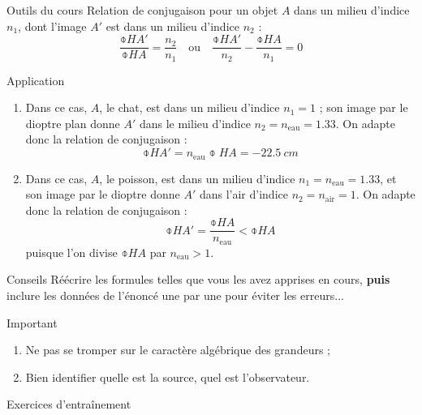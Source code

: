 \documentclass[10pt,notitlepage]{book}
\begin{document}
\begin{NCdemo}{Outils du cours}
    Relation de conjugaison pour un objet $A$ dans un milieu d'indice $n_1$,
    dont l'image $A'$ est dans un milieu d'indice $n_2$ :
    \[ \frac{\obar{HA'}}{\obar{HA}} = \frac{n_2}{n_1} \quad \mathrm{ou} \quad
    \frac{\obar{HA'}}{n_2} - \frac{\obar{HA}}{n_1} = 0 \]
\end{NCdemo}

\begin{NCexem}{Application}
    \begin{enumerate}
        \item Dans ce cas, $A$, le chat, est dans un milieu d'indice $n_1 = 1$ ;
            son image par le dioptre plan donne $A'$ dans le milieu d'indice
            $n_2 = n _\mathrm{eau} = 1.33$. On adapte donc la relation de conjugaison
            :
        \[ \obar{HA'} = n _\mathrm{eau}\obar{HA} = \SI{-22.5}{cm}\]
        \item Dans ce cas, $A$, le poisson, est dans un milieu d'indice $n_1 = n
            _\mathrm{eau} = 1.33$, et son image par le dioptre donne $A'$ dans l'air
            d'indice $n_2 = n _\mathrm{air} = 1$. On adapte donc la relation de
            conjugaison :
            \[ \obar{HA'} = \frac{\obar{HA}}{n _\mathrm{eau}} < \obar{HA} \]
            puisque l'on divise $\obar{HA}$ par $n _\mathrm{eau} > 1$.
    \end{enumerate}
\end{NCexem}

\begin{NCcoro}{Conseils}
    Réécrire les formules telles que vous les avez apprises en cours,
    \textbf{puis} inclure les données de l'énoncé une par une pour éviter les
    erreurs...
\end{NCcoro}

\begin{NCimpo}{Important}
    \begin{enumerate}
        \item Ne pas se tromper sur le caractère {\huge algébrique} des
            grandeurs ;
        \item Bien identifier quelle est la source, quel est l'observateur.
    \end{enumerate}
\end{NCimpo}

\begin{center}
    \Huge Exercices d'entraînement
\end{center}

\setcounter{section}{5}
\end{document}
